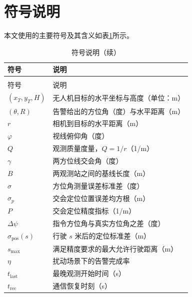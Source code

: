 
\section{符号说明}

本文使用的主要符号及其含义如表\ref{tab:符号说明}所示。

\begin{longtable}{>{\centering\arraybackslash}p{}>{\centering\arraybackslash}p{}}
  \caption{符号说明}
  \label{tab:符号说明} \\
  \toprule
  符号 & 说明 \\
  \midrule
  \endfirsthead
  \caption{符号说明（续）} \\
  \toprule
  符号 & 说明 \\
  \midrule
  \endhead
  \bottomrule
  \endfoot
  $(x_T,y_T,H)$ & 无人机目标的水平坐标与高度（单位：m） \\
  $(\theta,R)$ & 告警给出的方位角（度）与水平距离（m） \\
  $r$ & 相机到目标的水平距离（m） \\
  $\varphi$ & 视线俯仰角（度） \\
  $Q$ & 观测质量度量，$Q=1/r$（1/m） \\
  $\gamma$ & 两方位线交会角（度） \\
  $B$ & 两观测站之间的基线长度（m） \\
  $\sigma$ & 方位角测量误差标准差（度） \\
  $\sigma_p$ & 交会定位位置误差均方根（m） \\
  $P$ & 交会定位精度指标（1/m） \\
  $\Delta\psi$ & 指令方位角与真实方位角之差（度） \\
  $\sigma_{\mathrm{pos}}(s)$ & 行驶 $s$ 米后的定位标准差（m） \\
  $s_{\max}$ & 满足精度要求的最大允许行驶距离（m） \\
  $\eta$ & 扰动场景下的告警完成率 \\
  $t_{\mathrm{last}}$ & 最晚观测开始时间（s） \\
  $t_{\mathrm{rec}}$ & 通信恢复时刻（s） \\
\end{longtable}
